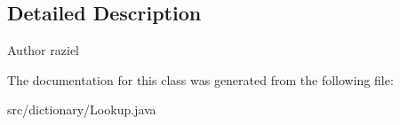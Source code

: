 \subsection{Detailed Description}
\begin{DoxyAuthor}{Author}
raziel 
\end{DoxyAuthor}


The documentation for this class was generated from the following file:\begin{DoxyCompactItemize}
\item 
src/dictionary/Lookup.java\end{DoxyCompactItemize}
